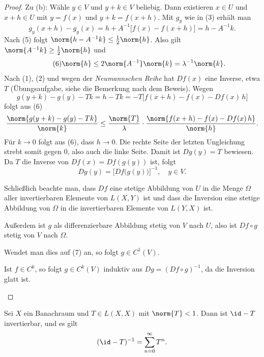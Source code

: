 \documentclass[11pt]{article}
\begin{document}
\begin{proof}
  Zu (b): Wähle $y \in V$ und $y + k \in V$ beliebig. Dann existieren $x \in U$ und $x + h \in U$ mit $y = f(x)$ und $y + k = f(x + h)$. Mit $g_y$ wie in (3) erhält man
  \[ g_y(x + h) - g_y(x) = h + A^{-1}\bigl[f(x) - f(x + h)\bigr] = h - A^{-1} k. \]
Nach (5) folgt $\norm{h - A^{-1} k} \le \frac{1}{2} \norm{h}$. Also gilt $\norm{A^{-1} k} \ge \frac{1}{2} \norm{h}$ und
  \begin{equation*}\tag{6}
    \norm{h} \le 2 \norm{A^{-1}} \norm{k} = \lambda^{-1} \norm{k}.
  \end{equation*}
Nach (1), (2) und wegen der \textit{Neumannschen Reihe} hat $Df(x)$ eine Inverse, etwa $T$ (Übungsaufgabe, siehe die Bemerkung nach dem Beweis). Wegen
\[ g(y + k) - g(y) - Tk = h - Tk = -T\bigl[f(x + h) - f(x) - Df(x)\, h\bigr] \]
  folgt aus (6)
  \[ \frac{\norm{g(y + k) - g(y) - Tk}}{\norm{k}} \le \frac{\norm{T}}{\lambda} \cdot \frac{\norm{f(x + h) - f(x) - Df(x)\, h}}{\norm{h}}. \]
Für $k \to 0$ folgt aus (6), dass $h \to 0$. Die rechte Seite der letzten Ungleichung strebt somit gegen $0$, also auch die linke Seite. Damit ist $Dg(y) = T$ bewiesen. Da $T$ die Inverse von $Df(x) = Df(g(y))$ ist, folgt
  \begin{equation*}\tag{7}
    Dg(y) = \bigl[Df\bigl(g(y)\bigr)\bigr]^{-1}, \quad y \in V.
  \end{equation*}


  Schließlich beachte man, dass $Df$ eine stetige Abbildung von $U$ in die Menge $\Omega$ aller invertierbaren Elemente von $L(X, Y)$ ist und dass die Inversion eine stetige Abbildung von $\Omega$ in die invertierbaren Elemente von $L(Y, X)$ ist.
\begin{ergaenzung}
  Außerdem ist $g$ als differenzierbare Abbildung stetig von $V$ nach $U$, also ist $Df \circ g$ stetig von $V$ nach $\Omega$.
  \end{ergaenzung}
  Wendet man dies auf (7) an, so folgt $g \in C^1(V)$.
\begin{ergaenzung}
  Ist $f \in C^k$, so folgt $g \in C^k(V)$ induktiv aus $Dg = (Df \circ g)^{-1}$, da die Inversion glatt ist.
  \end{ergaenzung}
\end{proof}


\begin{lemma}\Theorem
  Sei $X$ ein Banachraum und $T \in L(X, X)$ mit $\norm{T} < 1$. Dann ist $\id - T$ invertierbar, und es gilt
  \[ (\id - T)^{-1} = \sum_{n=0}^{\infty} T^n. \]
\end{lemma}
\end{document}
